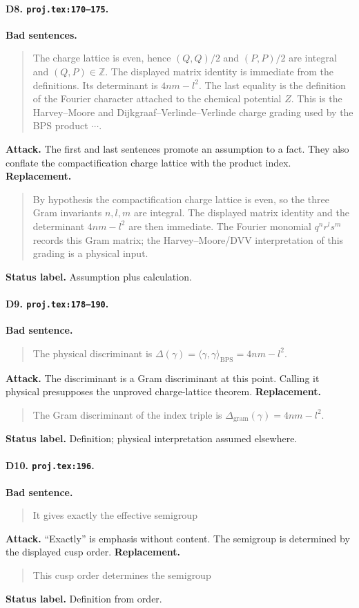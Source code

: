 \paragraph{D8. \texttt{proj.tex:170--175}.}
\textbf{Bad sentences.}
\begin{quote}\small
The charge lattice is even, hence \((Q,Q)/2\) and \((P,P)/2\) are integral
and \((Q,P)\in\mathbb Z\).  The displayed matrix identity is immediate
from the definitions.  Its determinant is \(4nm-l^2\).  The last equality
is the definition of the Fourier character attached to the chemical
potential \(Z\).  This is the Harvey--Moore and
Dijkgraaf--Verlinde--Verlinde charge grading used by the BPS product
\(\cdots\).
\end{quote}
\textbf{Attack.}
The first and last sentences promote an assumption to a fact.  They also
conflate the compactification charge lattice with the product index.
\textbf{Replacement.}
\begin{quote}\small
By hypothesis the compactification charge lattice is even, so the three
Gram invariants \(n,l,m\) are integral.  The displayed matrix identity and
the determinant \(4nm-l^2\) are then immediate.  The Fourier monomial
\(q^nr^ls^m\) records this Gram matrix; the Harvey--Moore/DVV
interpretation of this grading is a physical input.
\end{quote}
\textbf{Status label.} Assumption plus calculation.

\paragraph{D9. \texttt{proj.tex:178--190}.}
\textbf{Bad sentence.}
\begin{quote}\small
The physical discriminant is
\(\Delta(\gamma)=\langle\gamma,\gamma\rangle_{\mathrm{BPS}}=4nm-l^2\).
\end{quote}
\textbf{Attack.}
The discriminant is a Gram discriminant at this point.  Calling it
physical presupposes the unproved charge-lattice theorem.
\textbf{Replacement.}
\begin{quote}\small
The Gram discriminant of the index triple is
\(\Delta_{\mathrm{gram}}(\gamma)=4nm-l^2\).
\end{quote}
\textbf{Status label.} Definition; physical interpretation assumed
elsewhere.

\paragraph{D10. \texttt{proj.tex:196}.}
\textbf{Bad sentence.}
\begin{quote}\small
It gives exactly the effective semigroup
\end{quote}
\textbf{Attack.}
``Exactly'' is emphasis without content.  The semigroup is determined by
the displayed cusp order.
\textbf{Replacement.}
\begin{quote}\small
This cusp order determines the semigroup
\end{quote}
\textbf{Status label.} Definition from order.

